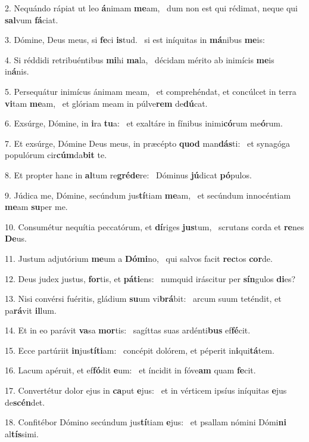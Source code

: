 2. Nequándo rápiat ut leo \textbf{á}nimam \textbf{me}am, \ast\  dum non est qui rédimat, neque qui \textbf{sal}vum \textbf{fá}ciat.\

3. Dómine, Deus meus, si \textbf{fe}ci \textbf{is}tud. \ast\  si est iníquitas in \textbf{má}nibus \textbf{me}is:\

4. Si réddidi retribuéntibus \textbf{mi}hi \textbf{ma}la, \ast\  décidam mérito ab inimícis \textbf{me}is in\textbf{á}nis.\

5. Persequátur inimícus ánimam meam, \dag\  et comprehéndat, et concúlcet in terra \textbf{vi}tam \textbf{me}am, \ast\  et glóriam meam in púlve\textbf{rem} de\textbf{dú}cat.\

6. Exsúrge, Dómine, in \textbf{i}ra \textbf{tu}a: \ast\  et exaltáre in fínibus inimi\textbf{có}rum me\textbf{ó}rum.\

7. Et exsúrge, Dómine Deus meus, in præcépto \textbf{quod} man\textbf{dás}ti: \ast\  et synagóga populórum cir\textbf{cúm}da\textbf{bit} te.\

8. Et propter hanc in \textbf{al}tum re\textbf{gré}\textbf{de}re: \ast\  Dóminus \textbf{jú}dicat \textbf{pó}pulos.\

9. Júdica me, Dómine, secúndum jus\textbf{tí}tiam \textbf{me}am, \ast\  et secúndum innocéntiam \textbf{me}am \textbf{su}per me.\

10. Consumétur nequítia peccatórum, et \textbf{dí}riges \textbf{jus}tum, \ast\  scrutans corda et \textbf{re}nes \textbf{De}us.\

11. Justum adjutórium \textbf{me}um a \textbf{Dó}\textbf{mi}no, \ast\  qui salvos facit \textbf{rec}tos \textbf{cor}de.\

12. Deus judex justus, \textbf{for}tis, et \textbf{pá}\textbf{ti}ens: \ast\  numquid iráscitur per \textbf{sín}gulos \textbf{di}es?\

13. Nisi convérsi fuéritis, gládium \textbf{su}um vi\textbf{brá}bit: \ast\  arcum suum teténdit, et pa\textbf{rá}vit \textbf{il}lum.\

14. Et in eo parávit \textbf{va}sa \textbf{mor}tis: \ast\  sagíttas suas ardénti\textbf{bus} ef\textbf{fé}cit.\

15. Ecce partúriit \textbf{in}jus\textbf{tí}\textbf{ti}am: \ast\  concépit dolórem, et péperit in\textbf{i}qui\textbf{tá}tem.\

16. Lacum apéruit, et ef\textbf{fó}dit \textbf{e}um: \ast\  et íncidit in fóve\textbf{am} quam \textbf{fe}cit.\

17. Convertétur dolor ejus in \textbf{ca}put \textbf{e}jus: \ast\  et in vérticem ipsíus iníquitas \textbf{e}jus de\textbf{scén}det.\

18. Confitébor Dómino secúndum jus\textbf{tí}tiam \textbf{e}jus: \ast\  et psallam nómini Dómi\textbf{ni} al\textbf{tís}simi.\


